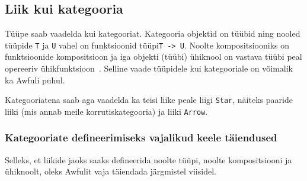 \documentclass[12pt]{article}
\begin{document}
    \subsection{Liik kui kategooria}
      Tüüpe saab vaadelda kui kategooriat. Kategooria objektid on tüübid ning nooled tüüpide \verb!T! ja \verb!U! vahel on funktsioonid tüüpi\verb!T -> U!. Noolte kompositsiooniks on funktsioonide kompositsioon ja iga objekti (tüübi) ühiknool on vastava tüübi peal opereeriv ühikfunktsioon~\cite{Car, Fas}. Selline vaade tüüpidele kui kategooriale on võimalik ka Awfuli puhul.

      Kategooriatena saab aga vaadelda ka teisi liike peale liigi \verb!Star!, näiteks paaride liiki (mis annab meile korrutiskategooria) ja liiki \verb!Arrow!.
      \subsubsection{Kategooriate defineerimiseks vajalikud keele täiendused}
        Selleks, et liikide jaoks saaks defineerida noolte tüüpi, noolte kompositsiooni ja ühiknoolt, oleks Awfulit vaja täiendada järgmistel viisidel.
\end{document}
